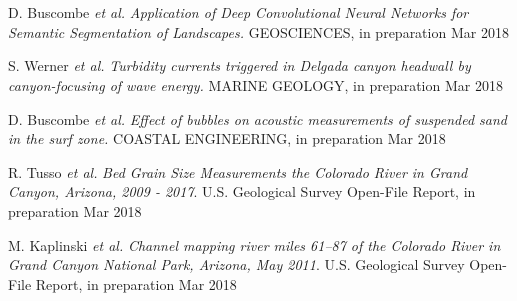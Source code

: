 \documentclass{article} %
\def\sf{\sffamily}
\def\sl{\slshape}
\newlength\sidebarwidth
\newcommand{\subtopic}[3][]
	 {\begin{minipage}{\textwidth}
	 \vspace*{.4\baselineskip}
         \nopagebreak\hspace{0in}%
         \nopagebreak\begin{minipage}[t]{\sidebarwidth - .2cm}
         \raggedleft {\sf\fontseries{sbc}\selectfont #2}
         {\\[-0.2\baselineskip] \textcolor{gray}{\footnotesize #1}}
	 \end{minipage}%
	 \hfill
	 \begin{minipage}[t]{\linewidth - \sidebarwidth}
	 #3%
	 \end{minipage}%
	 \vspace*{.2\baselineskip plus 1\baselineskip minus
	 .2\baselineskip}%
	 \end{minipage}}
\begin{document}
\subtopic{\hspace*{-3ex} Forthcoming}{~
  \begin{itemize}[leftmargin=0ex, itemsep=0ex, parsep=.5ex, labelindent=-4ex]

    \publication
      D. Buscombe {\sl et al.}
      {\sl Application of Deep Convolutional Neural Networks for Semantic Segmentation of Landscapes.}
      GEOSCIENCES, in preparation Mar 2018

    \publication
      S. Werner {\sl et al.}
      {\sl Turbidity currents triggered in Delgada canyon headwall by canyon-focusing of wave energy.}
      MARINE GEOLOGY, in preparation Mar 2018

    \publication
      D. Buscombe {\sl et al.}
      {\sl Effect of bubbles on acoustic measurements of suspended sand in the surf zone.}
      COASTAL ENGINEERING, in preparation Mar 2018

    \publication
      R. Tusso {\sl et al.}
      {\sl Bed Grain Size Measurements the Colorado River in Grand Canyon, Arizona, 2009 - 2017}.
      U.S. Geological Survey Open-File Report, in preparation Mar 2018

    \publication
      M. Kaplinski {\sl et al.}
      {\sl Channel mapping river miles 61–87 of the Colorado River in Grand Canyon National Park, Arizona, May 2011}.
      U.S. Geological Survey Open-File Report, in preparation Mar 2018

    \end{itemize}
}
\end{document}
